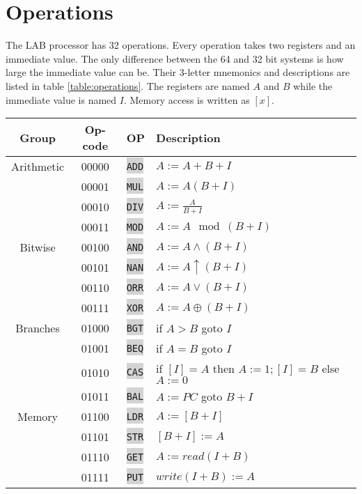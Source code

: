 \documentclass{article}
\newcommand{\labcode}[1]{\colorbox{lightgray}{\lstinline[language=lab]{#1}}}
\begin{document}
\section{Operations}

The LAB processor has 32 operations. Every operation takes two registers and an
immediate value. The only difference between the 64 and 32 bit systems is how
large the immediate value can be. Their 3-letter mnemonics and descriptions
are listed in table \ref{table:operations}. The registers are named $A$ and $B$
while the immediate value is named $I$. Memory access is written as
$[x]$.

\begin{table}[h!]
\centering
\begin{tabular}{cclll}
    \toprule Group & Op-code & OP & Description \\ \midrule
    Arithmetic  & 00000 & \labcode{ADD} & $A := A + B + I$ \\
                & 00001 & \labcode{MUL} & $A := A(B + I)$ \\
                & 00010 & \labcode{DIV} & $A := \frac{A}{B + I}$ \\
                & 00011 & \labcode{MOD} & $A := A \mod (B + I)$ \\ \midrule
    Bitwise     & 00100 & \labcode{AND} & $A := A \land (B + I)$ \\
                & 00101 & \labcode{NAN} & $A := A \uparrow (B + I)$ \\
                & 00110 & \labcode{ORR} & $A := A \lor (B + I)$ \\
                & 00111 & \labcode{XOR} & $A := A \oplus (B + I)$ \\ \midrule
    Branches    & 01000 & \labcode{BGT} & if $A > B$ goto $I$ \\
                & 01001 & \labcode{BEQ} & if $A = B$ goto $I$ \\
                & 01010 & \labcode{CAS} & if $[I] = A$ then $A := 1; [I] = B$ else $A := 0$ \\
                & 01011 & \labcode{BAL} & $A := PC$ goto $B + I$ \\ \midrule
    Memory      & 01100 & \labcode{LDR} & $A := [B + I]$ \\
                & 01101 & \labcode{STR} & $[B + I] := A$ \\
                & 01110 & \labcode{GET} & $A := read(I + B)$ \\
                & 01111 & \labcode{PUT} & $write(I + B) := A$ \\ \midrule

\end{tabular}
\end{table}
\end{document}
